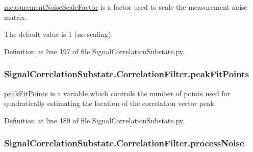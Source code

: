 \hyperlink{classSignalCorrelationSubstate_1_1CorrelationFilter_a21fc425a1d3bcb40b44afbca1f908de1}{measurement\+Noise\+Scale\+Factor} is a factor used to scale the measurement noise matrix. 

The default value is 1 (no scaling). 

Definition at line 197 of file Signal\+Correlation\+Substate.\+py.

\subsubsection[{\texorpdfstring{peak\+Fit\+Points}{peakFitPoints}}]{\setlength{\rightskip}{0pt plus 5cm}Signal\+Correlation\+Substate.\+Correlation\+Filter.\+peak\+Fit\+Points}\hypertarget{classSignalCorrelationSubstate_1_1CorrelationFilter_a85a73739e9bb0a7f20886a812a3afa83}{}\label{classSignalCorrelationSubstate_1_1CorrelationFilter_a85a73739e9bb0a7f20886a812a3afa83}


\hyperlink{classSignalCorrelationSubstate_1_1CorrelationFilter_a85a73739e9bb0a7f20886a812a3afa83}{peak\+Fit\+Points} is a variable which controls the number of points used for quadratically estimating the location of the correlation vector peak 



Definition at line 189 of file Signal\+Correlation\+Substate.\+py.

\subsubsection[{\texorpdfstring{process\+Noise}{processNoise}}]{\setlength{\rightskip}{0pt plus 5cm}Signal\+Correlation\+Substate.\+Correlation\+Filter.\+process\+Noise}\hypertarget{classSignalCorrelationSubstate_1_1CorrelationFilter_abbd9598dd2d237abb1eef86ba427da7f}{}\label{classSignalCorrelationSubstate_1_1CorrelationFilter_abbd9598dd2d237abb1eef86ba427da7f}


